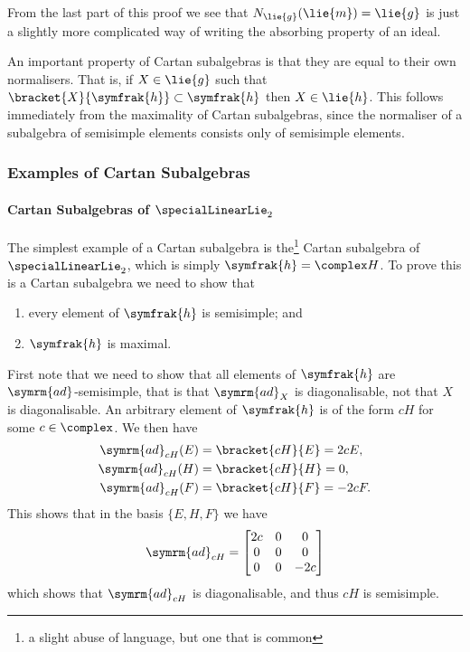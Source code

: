 \documentclass[fleqn]{NotesClass}
\newcommand{\ad}{\symrm{ad}}
\newcommand{\csa}{\symfrak{h}}
\begin{document}
    From the last part of this proof we see that \(N_{\lie{g}}(\lie{m}) = \lie{g}\) is just a slightly more complicated way of writing the absorbing property of an ideal.
    
    An important property of Cartan subalgebras is that they are equal to their own normalisers.
    That is, if \(X \in \lie{g}\) such that \(\bracket{X}{\csa} \subset \csa\) then \(X \in \lie{h}\).
    This follows immediately from the maximality of Cartan subalgebras, since the normaliser of a subalgebra of semisimple elements consists only of semisimple elements.
    
    \subsubsection{Examples of Cartan Subalgebras}
    \paragraph{Cartan Subalgebras of \(\specialLinearLie_2\)}
    The simplest example of a Cartan subalgebra is the\footnote{a slight abuse of language, but one that is common} Cartan subalgebra of \(\specialLinearLie_2\), which is simply \(\csa = \complex H\).
    To prove this is a Cartan subalgebra we need to show that
    \begin{enumerate}[label=\alph*)]
        \item every element of \(\csa\) is semisimple; and
        \item \(\csa\) is maximal.
    \end{enumerate}
    
    First note that we need to show that all elements of \(\csa\) are \(\ad\)-semisimple, that is that \(\ad_X\) is diagonalisable, not that \(X\) is diagonalisable.
    An arbitrary element of \(\csa\) is of the form \(cH\) for some \(c \in \complex\).
    We then have
    \begin{align}
        \ad_{cH}(E) &= \bracket{cH}{E} = 2cE,\\
        \ad_{cH}(H) &= \bracket{cH}{H} = 0,\\
        \ad_{cH}(F) &= \bracket{cH}{F} = -2cF.\\
    \end{align}
    This shows that in the basis \(\{E, H, F\}\) we have
    \begin{equation}
        \ad_{cH} = 
        \begin{bmatrix}
            2c & 0 & 0\\
            0 & 0 & 0\\
            0 & 0 & -2c
        \end{bmatrix}
    \end{equation}
    which shows that \(\ad_{cH}\) is diagonalisable, and thus \(cH\) is semisimple.
    
\end{document}
